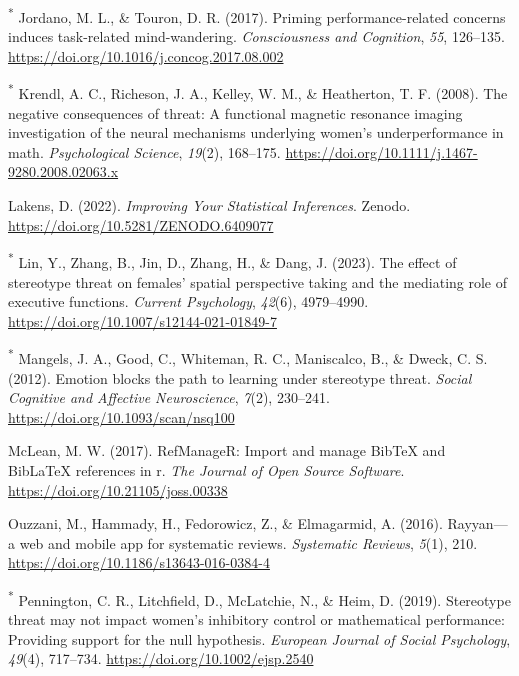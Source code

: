 \documentclass[
  stu, a4paper,floatsintext]{apa7}
\newlength{\cslhangindent}
\newenvironment{CSLReferences}[2] %
 {\begin{list}{}{%
  \setlength{\itemindent}{0pt}
  \setlength{\leftmargin}{0pt}
  \setlength{\parsep}{0pt}
  \ifodd #1
   \setlength{\leftmargin}{\cslhangindent}
   \setlength{\itemindent}{-1\cslhangindent}
  \fi
  \setlength{\itemsep}{#2\baselineskip}}}
 {\end{list}}
\begin{document}
\begin{CSLReferences}{1}{0}
\textsuperscript{*} Jordano, M. L., \& Touron, D. R. (2017). Priming performance-related concerns induces task-related mind-wandering. \emph{Consciousness and Cognition}, \emph{55}, 126--135. \url{https://doi.org/10.1016/j.concog.2017.08.002}

\textsuperscript{*} Krendl, A. C., Richeson, J. A., Kelley, W. M., \& Heatherton, T. F. (2008). The negative consequences of threat: A functional magnetic resonance imaging investigation of the neural mechanisms underlying women's underperformance in math. \emph{Psychological Science}, \emph{19}(2), 168--175. \url{https://doi.org/10.1111/j.1467-9280.2008.02063.x}

Lakens, D. (2022). \emph{Improving {Your Statistical Inferences}}. Zenodo. \url{https://doi.org/10.5281/ZENODO.6409077}

\textsuperscript{*} Lin, Y., Zhang, B., Jin, D., Zhang, H., \& Dang, J. (2023). The effect of stereotype threat on females' spatial perspective taking and the mediating role of executive functions. \emph{Current Psychology}, \emph{42}(6), 4979--4990. \url{https://doi.org/10.1007/s12144-021-01849-7}

\textsuperscript{*} Mangels, J. A., Good, C., Whiteman, R. C., Maniscalco, B., \& Dweck, C. S. (2012). Emotion blocks the path to learning under stereotype threat. \emph{Social Cognitive and Affective Neuroscience}, \emph{7}(2), 230--241. \url{https://doi.org/10.1093/scan/nsq100}

McLean, M. W. (2017). RefManageR: Import and manage BibTeX and BibLaTeX references in r. \emph{The Journal of Open Source Software}. \url{https://doi.org/10.21105/joss.00338}

Ouzzani, M., Hammady, H., Fedorowicz, Z., \& Elmagarmid, A. (2016). Rayyan---a web and mobile app for systematic reviews. \emph{Systematic Reviews}, \emph{5}(1), 210. \url{https://doi.org/10.1186/s13643-016-0384-4}

\textsuperscript{*} Pennington, C. R., Litchfield, D., McLatchie, N., \& Heim, D. (2019). Stereotype threat may not impact women's inhibitory control or mathematical performance: {Providing} support for the null hypothesis. \emph{European Journal of Social Psychology}, \emph{49}(4), 717--734. \url{https://doi.org/10.1002/ejsp.2540}


\end{CSLReferences}
\end{document}
